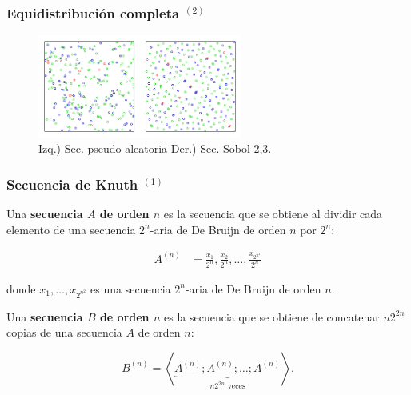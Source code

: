 \documentclass[t, 10pt, mathserif]{beamer}
\begin{document}

\begin{frame}
  \frametitle{Equidistribución completa {$^{(2)}$}}

  \vspace{0.5cm}
  \begin{figure}
    \includegraphics[width=0.6\textwidth]{resources/discrepancia.png}
    \caption{Izq.) Sec. pseudo-aleatoria Der.) Sec. Sobol 2,3. }
  \end{figure}
\end{frame}
 

\begin{frame}
  \frametitle{Secuencia de Knuth {$^{(1)}$}}
  \pause

  \vspace{-0.5cm}
  \begin{definition}
    \medskip
    Una \textbf{secuencia $A$ de orden $n$} es la secuencia que se obtiene al dividir cada elemento de una secuencia $2^n$-aria de De Bruijn de orden $n$ por $2^n$:
    \pause

    \begin{equation*}
      \begin{aligned}
        A^{(n)} & = \frac{x_1}{2^n}, \frac{x_2}{2^n}, \dots, \frac{x_{2^{n^2}}}{2^n}
      \end{aligned}
    \end{equation*}

    \medskip
    donde $x_1, \dots, x_{2^{n^2}}$ es una secuencia $2^n$-aria de De Bruijn de orden $n$.
  \end{definition}
  \pause

  \begin{definition}
    \medskip
    Una \textbf{secuencia $B$ de orden $n$} es la secuencia que se obtiene de concatenar $n 2^{2 n}$ copias de una secuencia $A$ de orden $n$:
    \pause

    \begin{equation*}
      B^{(n)} = \left< \underbrace{A^{(n)} ; A^{(n)} ; \dots ; A^{(n)}}_{n 2^{2 n} \text{ veces}} \right> \text{.}
    \end{equation*}
  \end{definition}
\end{frame}
\end{document}
